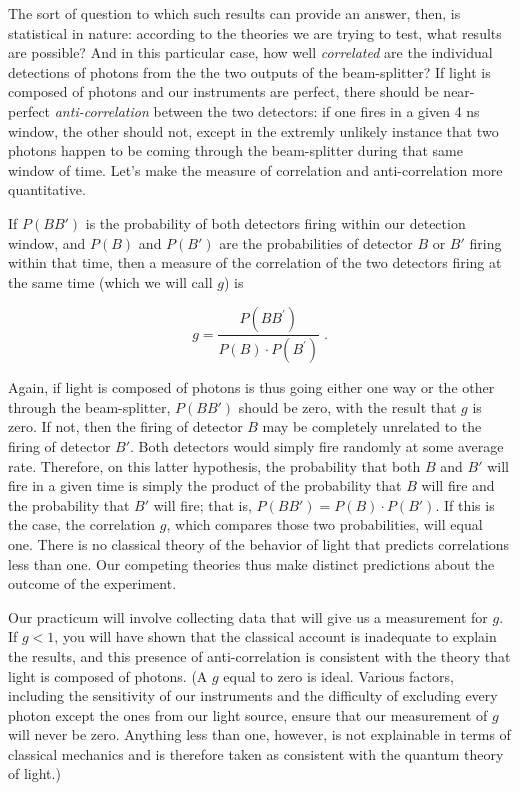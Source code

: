 The sort of question to which such results can provide an answer, then, is statistical in nature: according to the theories we are trying to test, what results are possible? And in this particular case, how well \emph{correlated} are the individual detections of photons from the the two outputs of the beam-splitter? If light is composed of photons and our instruments are perfect, there should be near-perfect \emph{anti-correlation} between the two detectors: if one fires in a given 4 ns window, the other should not, except in the extremly unlikely instance that two photons happen to be coming through the beam-splitter during that same window of time. Let's make the measure of correlation and anti-correlation more quantitative.

If $P(BB')$ is the probability of both detectors firing within our detection window, and $P(B)$ and $P(B')$ are the probabilities of detector $B$ or $B'$ firing within that time, then a measure of the correlation of the two detectors firing at the same time (which we will call $g$) is

\[g = \frac{P(BB^\prime)}{P(B) \cdot P(B^\prime)} \; . \]



Again, if light is composed of photons is thus going either one way or the other through the beam-splitter, $P(BB')$ should be zero, with the result that $g$ is zero.  If not, then the firing of detector $B$ may be completely unrelated to the firing of detector $B'$.  Both detectors would simply fire randomly at some average rate.  Therefore, on this latter hypothesis, the probability that both $B$ and $B'$ will fire in a given time is simply the product of the probability that $B$ will fire and the probability that $B'$ will fire; that is, $P(BB') = P(B)\cdot P(B')$. If this is the case, the correlation $g$, which compares those two probabilities, will equal one.  There is no classical theory of the behavior of light that predicts correlations less than one. Our competing theories thus make distinct predictions about the outcome of the experiment.

Our practicum will involve collecting data that will give us a measurement for $g$.  If $g<1$, you will have shown that the classical account is inadequate to explain the results, and this presence of anti-correlation is consistent with the theory that light is composed of photons.  (A $g$ equal to zero is ideal.  Various factors, including the sensitivity of our instruments and the difficulty of excluding every photon except the ones from our light source, ensure that our measurement of $g$ will never be zero.  Anything less than one, however, is not explainable in terms of classical mechanics and is therefore taken as consistent with the quantum theory of light.)


